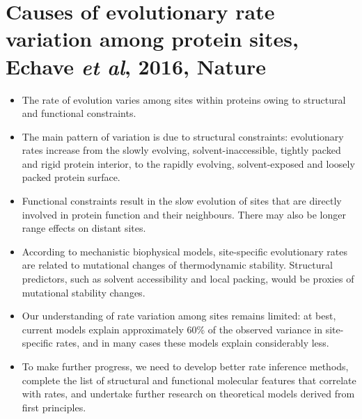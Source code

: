 \documentclass[10pt]{article}
\begin{document}
	
	\section*{Causes of evolutionary rate variation among protein sites, Echave \textit{et al}, 2016, Nature}
	\begin{itemize}
		\item 	The rate of evolution varies among sites within proteins owing to structural and functional constraints.
		
		\item The main pattern of variation is due to structural constraints: evolutionary rates increase from the slowly evolving, solvent-inaccessible, tightly packed and rigid protein interior, to the rapidly evolving, solvent-exposed and loosely packed protein surface.
		
		\item Functional constraints result in the slow evolution of sites that are directly involved in protein function and their neighbours. There may also be longer range effects on distant sites.
		
		\item According to mechanistic biophysical models, site-specific evolutionary rates are related to mutational changes of thermodynamic stability. Structural predictors, such as solvent accessibility and local packing, would be proxies of mutational stability changes.
		
	\item	Our understanding of rate variation among sites remains limited: at best, current models explain approximately 60\% of the observed variance in site-specific rates, and in many cases these models explain considerably less.
		
		\item To make further progress, we need to develop better rate inference methods, complete the list of structural and functional molecular features that correlate with rates, and undertake further research on theoretical models derived from first principles.
	\end{itemize}
	
\end{document}
